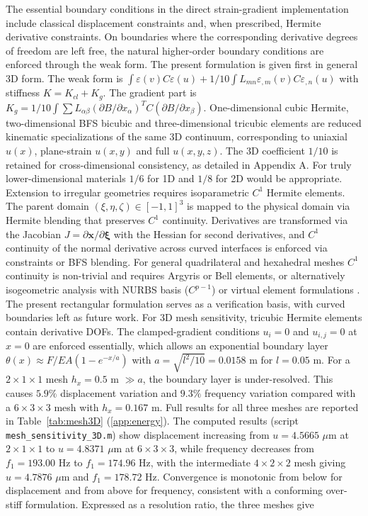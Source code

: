\documentclass[final,3p,times,fleqn]{elsarticle}
\begin{document}
The essential boundary conditions in the direct strain-gradient
implementation include classical displacement constraints and, when
prescribed, Hermite derivative constraints. On boundaries where the
corresponding derivative degrees of freedom are left free, the natural
higher-order boundary conditions are enforced through the weak form.
The present formulation is given first in general 3D form. The weak form is $\int\varepsilon(v)C\varepsilon(u)+1/10\int L_{mn}\varepsilon_{,m}(v)C\varepsilon_{,n}(u)$ with stiffness $K=K_{cl}+K_g$. The gradient part is $K_g=1/10\int\sum L_{\alpha\beta}(\partial B/\partial x_\alpha)^T C (\partial B/\partial x_\beta)$. One-dimensional cubic Hermite, two-dimensional BFS bicubic and three-dimensional tricubic elements are reduced kinematic specializations of the same 3D continuum, corresponding to uniaxial $u(x)$, plane-strain $u(x,y)$ and full $u(x,y,z)$. The 3D coefficient $1/10$ is retained for cross-dimensional consistency, as detailed in Appendix A. For truly lower-dimensional materials $1/6$ for 1D and $1/8$ for 2D would be appropriate. Extension to irregular geometries requires isoparametric $C^1$ Hermite elements. The parent domain $(\xi,\eta,\zeta)\in[-1,1]^3$ is mapped to the physical domain via Hermite blending that preserves $C^1$ continuity. Derivatives are transformed via the Jacobian $J=\partial\mathbf{x}/\partial\boldsymbol{\xi}$ with the Hessian for second derivatives, and $C^1$ continuity of the normal derivative across curved interfaces is enforced via constraints or BFS blending. For general quadrilateral and hexahedral meshes $C^1$ continuity is non-trivial and requires Argyris or Bell elements, or alternatively isogeometric analysis with NURBS basis ($C^{p-1}$) or virtual element formulations \cite{WriggersHudobivnik2023}. The present rectangular formulation serves as a verification basis, with curved boundaries left as future work. For 3D mesh sensitivity, tricubic Hermite elements contain derivative DOFs. The clamped-gradient conditions $u_i=0$ and $u_{i,j}=0$ at $x=0$ are enforced essentially, which allows an exponential boundary layer $\theta(x)\approx F/EA(1-e^{-x/a})$ with $a=\sqrt{l^2/10}=0.0158$ m for $l=0.05$ m. For a $2\times1\times1$ mesh $h_x=0.5$ m $\gg a$, the boundary layer is under-resolved. This causes $5.9\%$ displacement variation and $9.3\%$ frequency variation compared with a $6\times3\times3$ mesh with $h_x=0.167$ m. Full results for all three meshes are reported in
Table~\ref{tab:mesh3D} (\ref{app:energy}). The computed results (script \texttt{mesh\_sensitivity\_3D.m}) show displacement increasing from $u=4.5665$ $\mu$m at $2\times1\times1$ to $u=4.8371$ $\mu$m at $6\times3\times3$, while frequency decreases from $f_1=193.00$ Hz to $f_1=174.96$ Hz, with the intermediate $4\times2\times2$ mesh giving $u=4.7876$ $\mu$m and $f_1=178.72$ Hz. Convergence is monotonic from below for displacement and from above for frequency, consistent with a conforming over-stiff formulation. Expressed as a resolution ratio, the three meshes give
\end{document}
